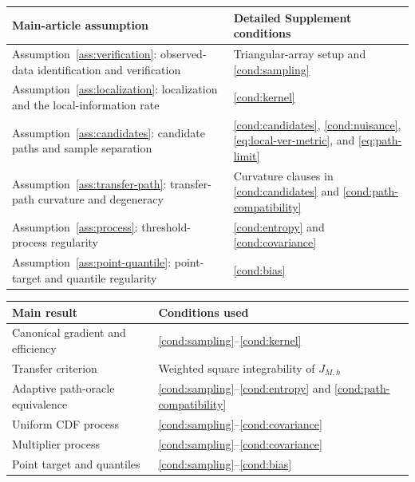 \begin{center}
\begin{tabular}{p{}p{}}
\toprule
Main-article assumption & Detailed Supplement conditions\\
\midrule
Assumption~\ref{ass:verification}: observed-data identification and verification
& Triangular-array setup and \ref{cond:sampling}\\
Assumption~\ref{ass:localization}: localization and the local-information rate
& \ref{cond:kernel}\\
Assumption~\ref{ass:candidates}: candidate paths and sample separation
& \ref{cond:candidates}, \ref{cond:nuisance}, \eqref{eq:local-ver-metric}, and \eqref{eq:path-limit}\\
Assumption~\ref{ass:transfer-path}: transfer-path curvature and degeneracy
& Curvature clauses in \ref{cond:candidates} and \ref{cond:path-compatibility}\\
Assumption~\ref{ass:process}: threshold-process regularity
& \ref{cond:entropy} and \ref{cond:covariance}\\
Assumption~\ref{ass:point-quantile}: point-target and quantile regularity
& \ref{cond:bias}\\
\bottomrule
\end{tabular}
\end{center}

\begin{center}
\begin{tabular}{ll}
\toprule
Main result & Conditions used\\
\midrule
Canonical gradient and efficiency & \ref{cond:sampling}--\ref{cond:kernel}\\
Transfer criterion & Weighted square integrability of \(J_{M,h}\)\\
Adaptive path-oracle equivalence & \ref{cond:sampling}--\ref{cond:entropy} and \ref{cond:path-compatibility}\\
Uniform CDF process & \ref{cond:sampling}--\ref{cond:covariance}\\
Multiplier process & \ref{cond:sampling}--\ref{cond:covariance}\\
Point target and quantiles & \ref{cond:sampling}--\ref{cond:bias}\\
\bottomrule
\end{tabular}
\end{center}
